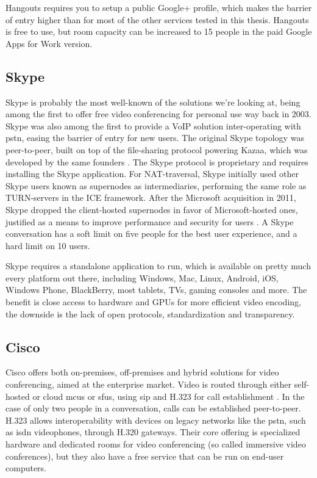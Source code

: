 Hangouts requires you to setup a public Google+ profile, which makes the barrier of entry higher than for most of the other services tested in this thesis. Hangouts is free to use, but room capacity can be increased to 15 people in the paid Google Apps for Work version.


\subsection{Skype}

Skype is probably the most well-known of the solutions we're looking at, being among the first to offer free video conferencing for personal use way back in 2003. Skype was also among the first to provide a VoIP solution inter-operating with \gls{pstn}, easing the barrier of entry for new users. The original Skype topology was peer-to-peer, built on top of the file-sharing protocol powering Kazaa, which was developed by the same founders \cite{skype-history}.  The Skype protocol is proprietary and requires installing the Skype application. For NAT-traversal, Skype initially used other Skype users known as supernodes as intermediaries, performing the same role as TURN-servers in the ICE framework. After the Microsoft acquisition in 2011, Skype dropped the client-hosted supernodes in favor of Microsoft-hosted ones, justified as a means to improve performance and security for users \cite{skype-topo-change}. A Skype conversation has a soft limit on five people for the best user experience, and a hard limit on 10 users.

Skype requires a standalone application to run, which is available on pretty much every platform out there, including Windows, Mac, Linux, Android, iOS, Windows Phone, BlackBerry, most tablets, TVs, gaming consoles and more. The benefit is close access to hardware and GPUs for more efficient video encoding, the downside is the lack of open protocols, standardization and transparency.


\subsection{Cisco}

Cisco offers both on-premises, off-premises and hybrid solutions for video conferencing, aimed at the enterprise market. Video is routed through either self-hosted or cloud \glspl{mcu} or \glspl{sfu}, using \gls{sip} and H.323 for call establishment \cite{cisco-arch}. In the case of only two people in a conversation, calls can be established peer-to-peer. H.323 allows interoperability with devices on legacy networks like the \gls{pstn}, such as \gls{isdn} videophones, through H.320 gateways. Their core offering is specialized hardware and dedicated rooms for video conferencing (so called immersive video conferences), but they also have a free service that can be run on end-user computers.
